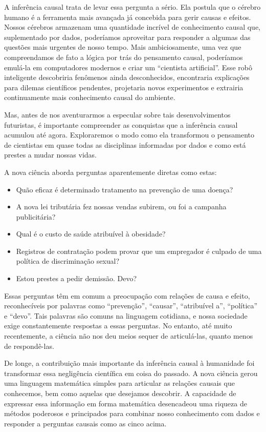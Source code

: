 \documentclass[11pt,a5paper,twoside]{book}
\begin{document}
A inferência causal trata de levar essa pergunta a sério. Ela postula que o cérebro humano é a ferramenta mais avançada já concebida para gerir causas e efeitos. Nossos cérebros armazenam uma quantidade incrível de conhecimento causal que, suplementado por dados, poderíamos aproveitar para responder a algumas das questões mais urgentes de nosso tempo. Mais ambiciosamente, uma vez que compreendamos de fato a lógica por trás do pensamento causal, poderíamos emulá-la em computadores modernos e criar um “cientista artificial”. Esse robô inteligente descobriria fenômenos ainda desconhecidos, encontraria explicações para dilemas científicos pendentes, projetaria novos experimentos e extrairia continuamente mais conhecimento causal do ambiente.

Mas, antes de nos aventurarmos a especular sobre tais desenvolvimentos futuristas, é importante compreender as conquistas que a inferência causal acumulou até agora. Exploraremos o modo como ela transformou o pensamento de cientistas em quase todas as disciplinas informadas por dados e como está prestes a mudar nossas vidas.

A nova ciência aborda perguntas aparentemente diretas como estas:

\begin{itemize}
\item Quão eficaz é determinado tratamento na prevenção de uma doença?
\item A nova lei tributária fez nossas vendas subirem, ou foi a campanha publicitária?
\item Qual é o custo de saúde atribuível à obesidade?
\item Registros de contratação podem provar que um empregador é culpado de uma política de discriminação sexual?
\item Estou prestes a pedir demissão. Devo?
\end{itemize}
Essas perguntas têm em comum a preocupação com relações de causa e efeito, reconhecíveis por palavras como “prevenção”, “causar”, “atribuível a”, “política” e “devo”. Tais palavras são comuns na linguagem cotidiana, e nossa sociedade exige constantemente respostas a essas perguntas. No entanto, até muito recentemente, a ciência não nos deu meios sequer de articulá-las, quanto menos de respondê-las.

De longe, a contribuição mais importante da inferência causal à humanidade foi transformar essa negligência científica em coisa do passado. A nova ciência gerou uma linguagem matemática simples para articular as relações causais que conhecemos, bem como aquelas que desejamos descobrir. A capacidade de expressar essa informação em forma matemática desencadeou uma riqueza de métodos poderosos e principados para combinar nosso conhecimento com dados e responder a perguntas causais como as cinco acima.
\end{document}
